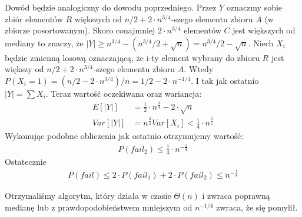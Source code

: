 Dowód będzie analogiczny do dowodu poprzedniego.
Przez $Y$ oznaczmy sobie zbiór elementów $R$ większych od $n/2 + 2\cdot n^{3/4}$-szego elementu zbioru $A$ (w zbiorze posortowanym).
Skoro conajmniej $2 \cdot n^{3/4}$ elementów $C$ jest większych od mediany to znaczy, że $|Y| \geq n^{3/4} - (n^{3/4}/2 + \sqrt{n}) = n^{3/4}/2 - \sqrt{n}$.
Niech $X_i$ będzie zmienną losową oznaczającą, że i-ty element wybrany do zbioru $R$ jest większy od $n/2 + 2\cdot n^{3/4}$-szego elementu zbioru $A$.
Wtedy $P(X_i = 1) = (n/2 - 2 \cdot n^{3/4}) / n = 1/2 - 2 \cdot n^{-1/4}$.
I tak jak ostatnio  $|Y| = \sum X_i$.
Teraz wartość oczekiwana oraz wariancja:
\begin{align*}
 E[|Y|] & = \frac{1}{2} \cdot n^{\frac{3}{4}} - 2 \cdot \sqrt{n} \\
 Var[|Y|] & = n^{\frac{3}{4}} Var[X_i] < \frac{1}{4} \cdot n^{\frac{3}{4}}
\end{align*}
Wykonując podobne obliczenia jak ostatnio otrzymujemy wartość:
\begin{align*}
 P\left(fail_2\right) \leq \frac{1}{4} \cdot n^{-\frac{1}{4}}
\end{align*}
Ostatecznie
\begin{align*}
 P\left(fail\right) \leq 2 \cdot P\left(fail_1\right) + 2 \cdot P\left(fail_2\right) \leq n^{-\frac{1}{4}}
\end{align*}

Otrzymaliśmy algorytm, który działa w czasie $\Theta(n)$ i zwraca poprawną medianę lub z prawdopodobieństwem mniejszym od $n^{-1/4}$ zwraca, że się pomylił.